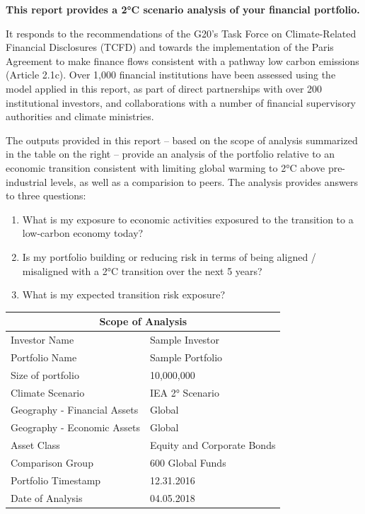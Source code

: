 \documentclass[10pt,table,a4]{article}\usepackage[]{graphicx}\usepackage[]{color}
\begin{document}
	\begin{multicols}{2}
		\textbf{This report provides a 2°C scenario analysis of your financial portfolio.} 
		
		It responds to the recommendations of the G20's Task Force on Climate-Related Financial Disclosures (TCFD) and towards the implementation of the Paris Agreement to make finance flows consistent with a pathway low carbon emissions (Article 2.1c). Over 1,000 financial institutions have been assessed using the model applied in this report, as part of direct partnerships with over 200 institutional investors, and collaborations with  a number of financial supervisory authorities and climate ministries. 
		
		The outputs provided in this report – based on the scope of analysis summarized in the table on the right – provide an analysis of the portfolio relative to an economic transition consistent with limiting global warming to 2°C above pre-industrial levels, as well as a comparision to peers. The analysis provides answers to three questions: 
		
		\begin{enumerate}
			\item{What is my exposure to economic activities exposured to the transition to a low-carbon economy today?}
			\item{Is my portfolio building or reducing risk in terms of being aligned / misaligned with a 2°C transition over the next 5 years?}
			\item{What is my expected transition risk exposure?}
		\end{enumerate}
		

			\begin{center}
			{
				\setlength{\tabcolsep}{10pt} %
				\renewcommand{\arraystretch}{1.5} %
				\begin{tabular}{ p{.35\linewidth} p{.49\linewidth} }
					\hline
					\multicolumn{2}{c}{\textbf{Scope of Analysis}} \\
					\hline
					Investor Name & Sample Investor  \\
					Portfolio Name & Sample Portfolio \\ 
					Size of portfolio & 10,000,000  \\ 
					Climate Scenario & IEA 2° Scenario  \\ 
					Geography - \newline Financial Assets & Global \\ 
					Geography - \newline Economic Assets & Global  \\ 
					Asset Class & Equity and Corporate Bonds \\ 
					Comparison Group & 600 Global Funds  \\
					Portfolio Timestamp & 12.31.2016  \\ 
					Date of Analysis & 04.05.2018  \\ 
					\hline
				\end{tabular}
			}
			

\end{center}
\end{multicols}
\end{document}
